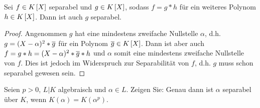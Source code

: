 \begin{exercisePage}
	
	\setcounter{taskcount}{53}
	
	\begin{lemma} \label{lemma: 4_54_teilersep}
		Sei $f \in \polynom[K]$ separabel und $g \in \polynom[K]$, sodass $f = g * h$ für ein weiteres Polynom $h \in \polynom[K]$. Dann ist auch $g$ separabel.
	\end{lemma}
	\begin{proof}
		Angenommen $g$ hat eine mindestens zweifache Nullstelle $\alpha$, d.h. $g = (X - \alpha)^2 * \overline{g}$ für ein Polynom $\quer{g} \in \polynom[K]$. Dann ist aber auch $f = g * h = (X - \alpha)^2 * \overline{g} * h$ und $\alpha$ somit eine mindestens zweifache Nullstelle von $f$. Dies ist jedoch im Widerspruch zur Separabilität von $f$, d.h. $g$ muss schon separabel gewesen sein.
	\end{proof}
	
	\begin{homework}
		Seien $p > 0$, $L|K$ algebraisch und $\alpha \in L$. Zeigen Sie: Genau dann ist $\alpha$ separabel über $K$, wenn $K(\alpha) = K(\alpha^p)$.
	\end{homework}



\end{exercisePage}
